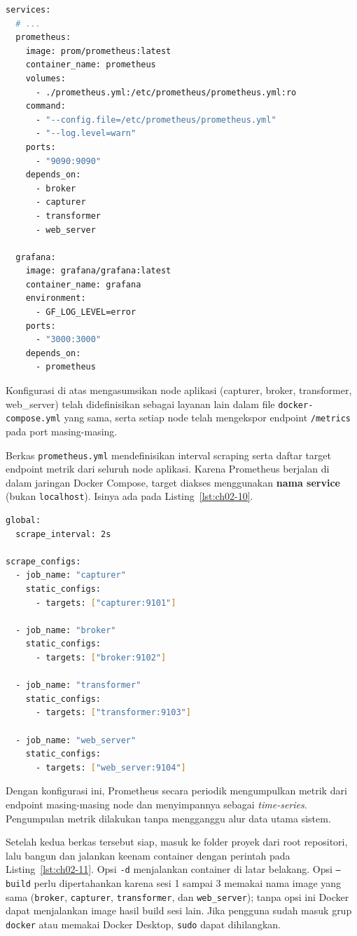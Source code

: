 \begin{enumerate}
\begin{lstlisting}[language=bash, caption={Cuplikan berkas docker-compose.yml}, label={lst:ch02-9}]
services:
  # ...
  prometheus:
    image: prom/prometheus:latest
    container_name: prometheus
    volumes:
      - ./prometheus.yml:/etc/prometheus/prometheus.yml:ro
    command:
      - "--config.file=/etc/prometheus/prometheus.yml"
      - "--log.level=warn"
    ports:
      - "9090:9090"
    depends_on:
      - broker
      - capturer
      - transformer
      - web_server

  grafana:
    image: grafana/grafana:latest
    container_name: grafana
    environment:
      - GF_LOG_LEVEL=error
    ports:
      - "3000:3000"
    depends_on:
      - prometheus
\end{lstlisting}

Konfigurasi di atas mengasumsikan node aplikasi (capturer, broker, transformer, web\_server) telah didefinisikan sebagai layanan lain dalam file \texttt{docker-compose.yml} yang sama, serta setiap node telah mengekspor endpoint \texttt{/metrics} pada port masing-masing.


Berkas \texttt{prometheus.yml} mendefinisikan interval scraping serta daftar target endpoint metrik dari seluruh node aplikasi. Karena Prometheus berjalan di dalam jaringan Docker Compose, target diakses menggunakan \textbf{nama service} (bukan \texttt{localhost}). Isinya ada pada Listing~\ref{lst:ch02-10}.

\begin{lstlisting}[language=bash, caption={Isi berkas prometheus.yml}, label={lst:ch02-10}]
global:
  scrape_interval: 2s

scrape_configs:
  - job_name: "capturer"
    static_configs:
      - targets: ["capturer:9101"]

  - job_name: "broker"
    static_configs:
      - targets: ["broker:9102"]

  - job_name: "transformer"
    static_configs:
      - targets: ["transformer:9103"]

  - job_name: "web_server"
    static_configs:
      - targets: ["web_server:9104"]
\end{lstlisting}

Dengan konfigurasi ini, Prometheus secara periodik mengumpulkan metrik dari endpoint masing-masing node dan menyimpannya sebagai \emph{time-series}. Pengumpulan metrik dilakukan tanpa mengganggu alur data utama sistem.

Setelah kedua berkas tersebut siap, masuk ke folder proyek dari root repositori, lalu bangun dan jalankan keenam container dengan perintah pada Listing~\ref{lst:ch02-11}. Opsi \texttt{-d} menjalankan container di latar belakang. Opsi \texttt{--build} perlu dipertahankan karena sesi 1 sampai 3 memakai nama image yang sama (\texttt{broker}, \texttt{capturer}, \texttt{transformer}, dan \texttt{web\_server}); tanpa opsi ini Docker dapat menjalankan image hasil build sesi lain. Jika pengguna sudah masuk grup \texttt{docker} atau memakai Docker Desktop, \texttt{sudo} dapat dihilangkan.


\end{enumerate}
